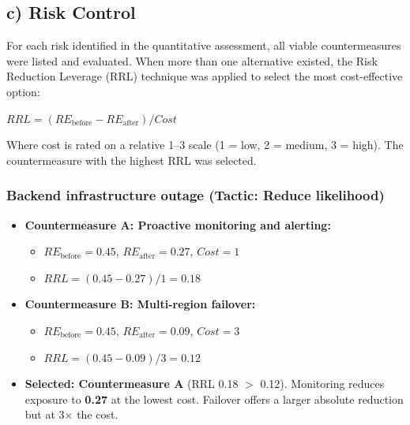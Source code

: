 \documentclass[11pt]{article}
\begin{document}
\subsection{c) Risk Control}

For each risk identified in the quantitative assessment, all viable countermeasures were listed and evaluated. When more than one alternative existed, the Risk Reduction Leverage (RRL) technique was applied to select the most cost-effective option:

$RRL = (RE_{\text{before}} - RE_{\text{after}}) / Cost$ 

Where cost is rated on a relative 1--3 scale (1 = low, 2 = medium, 3 = high). The countermeasure with the highest RRL was selected.

\subsubsection*{Backend infrastructure outage (Tactic: Reduce likelihood)}
\begin{itemize}[leftmargin=1.5em]
  \item \textbf{Countermeasure A: Proactive monitoring and alerting:}
  \begin{itemize}[leftmargin=1.5em]
    \item $RE_{\text{before}} = 0.45$, $RE_{\text{after}} = 0.27$, $Cost = 1$
    \item $RRL = (0.45 - 0.27) / 1 = 0.18$
  \end{itemize}
  \item \textbf{Countermeasure B: Multi-region failover:}
  \begin{itemize}[leftmargin=1.5em]
    \item $RE_{\text{before}} = 0.45$, $RE_{\text{after}} = 0.09$, $Cost = 3$
    \item $RRL = (0.45 - 0.09) / 3 = 0.12$
  \end{itemize}
  \item \textbf{Selected: Countermeasure A} (RRL 0.18 $>$ 0.12). Monitoring reduces exposure to \textbf{0.27} at the lowest cost. Failover offers a larger absolute reduction but at 3$\times$ the cost.
\end{itemize}
\end{document}
